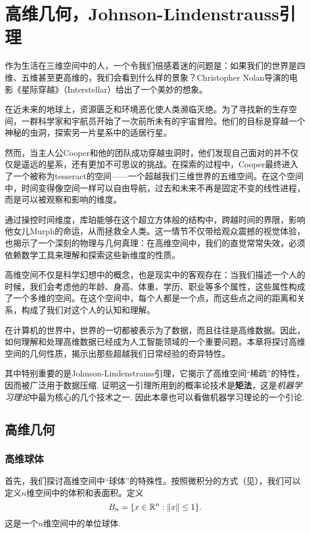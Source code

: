  \chapter{高维几何，Johnson-Lindenstrauss引理}\label{cha:J-L-Lemma}

作为生活在三维空间中的人，一个令我们倍感着迷的问题是：如果我们的世界是四维、五维甚至更高维的，我们会看到什么样的景象？Christopher Nolan导演的电影《星际穿越》（Interstellar）给出了一个美妙的想象。

在近未来的地球上，资源匮乏和环境恶化使人类濒临灭绝。为了寻找新的生存空间，一群科学家和宇航员开始了一次前所未有的宇宙冒险。他们的目标是穿越一个神秘的虫洞，探索另一片星系中的适居行星。

然而，当主人公Cooper和他的团队成功穿越虫洞时，他们发现自己面对的并不仅仅是遥远的星系，还有更加不可思议的挑战。在探索的过程中，Cooper最终进入了一个被称为tesseract的空间——一个超越我们三维世界的五维空间。在这个空间中，时间变得像空间一样可以自由导航，过去和未来不再是固定不变的线性进程，而是可以被观察和影响的维度。

通过操控时间维度，库珀能够在这个超立方体般的结构中，跨越时间的界限，影响他女儿Murph的命运，从而拯救全人类。这一情节不仅带给观众震撼的视觉体验，也揭示了一个深刻的物理与几何真理：在高维空间中，我们的直觉常常失效，必须依赖数学工具来理解和探索这些新维度的性质。

高维空间不仅是科学幻想中的概念，也是现实中的客观存在：当我们描述一个人的时候，我们会考虑他的年龄、身高、体重、学历、职业等多个属性，这些属性构成了一个多维的空间。在这个空间中，每个人都是一个点，而这些点之间的距离和关系，构成了我们对这个人的认知和理解。


在计算机的世界中，世界的一切都被表示为了数据，而且往往是高维数据。因此，如何理解和处理高维数据已经成为人工智能领域的一个重要问题。本章将探讨高维空间的几何性质，揭示出那些超越我们日常经验的奇异特性。

其中特别重要的是Johnson-Lindenstrauss引理，它揭示了高维空间“稀疏”的特性，因而被广泛用于数据压缩. 证明这一引理所用到的概率论技术是\textbf{矩法}，这是\emph{机器学习理论}中最为核心的几个技术之一. 因此本章也可以看做机器学习理论的一个引论. 

\section{高维几何}

\subsection{高维球体}
首先，我们探讨高维空间中“球体”的特殊性。按照微积分的方式（见），我们可以定义$n$维空间中的体积和表面积。定义
\[B_n = \{x \in \mathbb{R}^n: \left\|x\right\| \leq 1\}.\]
这是一个$n$维空间中的单位球体. 

